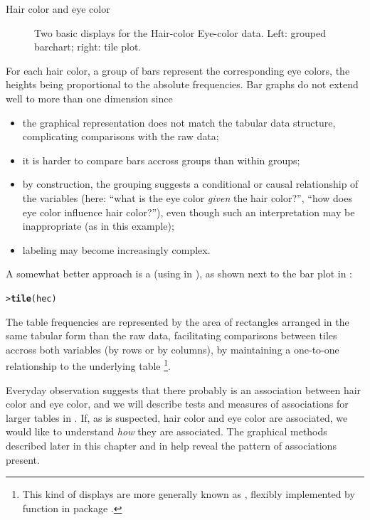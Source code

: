 \documentclass[10pt,krantz2]{krantz}\usepackage[]{graphicx}\usepackage[]{color}
\makeatletter
\newcommand{\hlstd}[1]{\textcolor[rgb]{0.345,0.345,0.345}{#1}}%
\newcommand{\hlkwd}[1]{\textcolor[rgb]{0.737,0.353,0.396}{\textbf{#1}}}%
\newenvironment{kframe}{%
 \def\at@end@of@kframe{}%
 \ifinner\ifhmode%
  \def\at@end@of@kframe{\end{minipage}}%
  \begin{minipage}{\columnwidth}%
 \fi\fi%
 \def\FrameCommand##1{\hskip\@totalleftmargin \hskip-\fboxsep
 \colorbox{shadecolor}{##1}\hskip-\fboxsep
     \hskip-\linewidth \hskip-\@totalleftmargin \hskip\columnwidth}%
 \MakeFramed {\advance\hsize-\width
   \@totalleftmargin\z@ \linewidth\hsize
   \@setminipage}}%
 {\par\unskip\endMakeFramed%
 \at@end@of@kframe}
\newenvironment{knitrout}{}{} %
\renewenvironment{knitrout}{\small\renewcommand{\baselinestretch}{.85}}{} %
\makeatother
\begin{document}
\begin{Example}[haireye1]{Hair color and eye color}
\begin{knitrout}
\begin{figure}[!htbp]
\caption[Two basic displays for the Hair-color Eye-color data]{Two basic displays for the Hair-color Eye-color data. Left: grouped barchart; right: tile plot.\label{fig:bartile}}
\end{figure}


\end{knitrout}
\noindent For each hair
color, a group of bars represent the corresponding eye colors, the
heights being proportional to the absolute frequencies. Bar graphs do
not extend well to more than one dimension since
\begin{itemize}
\item the graphical representation does not match the tabular data structure,
  complicating comparisons with the raw data;
\item it is harder to compare bars accross groups than within groups;
\item by construction, the grouping suggests a conditional
or causal relationship of the variables (here: ``what is the eye color
  \emph{given} the hair color?'', ``how does eye color influence hair color?''), even
  though such an interpretation may be inappropriate (as in this example);
\item labeling may become increasingly complex.
\end{itemize}
A somewhat better approach is a  (using  in ), as shown next to the bar
plot in :
\begin{knitrout}
\color{fgcolor}\begin{kframe}
\begin{alltt}
\hlstd{> }\hlkwd{tile}\hlstd{(hec)}
\end{alltt}
\end{kframe}
\end{knitrout}
\noindent The table frequencies are represented by the area of
rectangles arranged in the same tabular form than the raw data,
facilitating comparisons between tiles accross both variables (by rows
or by columns), by maintaining a one-to-one relationship to the
underlying table
\footnote{This kind of displays are more generally known as
, flexibly implemented by function  in package .}.

Everyday observation suggests that there probably is an association
between hair color and eye color, and we will describe tests
and measures of associations for larger tables in
.
If, as is suspected, hair color and eye color are associated,
we would like to understand \emph{how} they are associated.
The graphical methods described later in this chapter
and in  help
reveal the pattern of associations present.
\end{Example}
\end{document}
